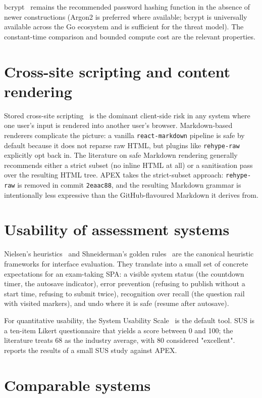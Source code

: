 bcrypt~\cite{provos1999bcrypt} remains the recommended password hashing function in the absence of newer constructions (Argon2 is preferred where available; bcrypt is universally available across the Go ecosystem and is sufficient for the threat model). The constant-time comparison and bounded compute cost are the relevant properties.

\section{Cross-site scripting and content rendering}

Stored cross-site scripting~\cite{cwe-79} is the dominant client-side risk in any system where one user's input is rendered into another user's browser. Markdown-based renderers complicate the picture: a vanilla \texttt{react-markdown} pipeline is safe by default because it does not reparse raw HTML, but plugins like \texttt{rehype-raw} explicitly opt back in. The literature on safe Markdown rendering generally recommends either a strict subset (no inline HTML at all) or a sanitisation pass over the resulting HTML tree. APEX takes the strict-subset approach: \texttt{rehype-raw} is removed in commit \texttt{2eaac88}, and the resulting Markdown grammar is intentionally less expressive than the GitHub-flavoured Markdown it derives from.

\section{Usability of assessment systems}

Nielsen's heuristics~\cite{nielsen-heuristics} and Shneiderman's golden rules~\cite{shneiderman-rules} are the canonical heuristic frameworks for interface evaluation. They translate into a small set of concrete expectations for an exam-taking SPA: a visible system status (the countdown timer, the autosave indicator), error prevention (refusing to publish without a start time, refusing to submit twice), recognition over recall (the question rail with visited markers), and undo where it is safe (resume after autosave).

For quantitative usability, the System Usability Scale~\cite{brooke1996sus} is the default tool. SUS is a ten-item Likert questionnaire that yields a score between 0 and 100; the literature treats 68 as the industry average, with 80 considered "excellent".  reports the results of a small SUS study against APEX.

\section{Comparable systems}

